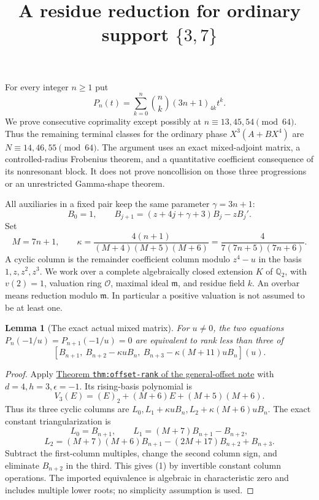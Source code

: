 \documentclass[11pt]{article}
\newtheorem{lemma}{Lemma}
\begin{document}
\setlength{\emergencystretch}{1em}
\title{A residue reduction for ordinary support $\{3,7\}$}
\author{}\date{}\maketitle
For every integer $n\ge1$ put
\[
 P_n(t)=\sum_{k=0}^n\binom nk(3n+1)_{4k}t^k.
\]
We prove consecutive coprimality except possibly at
$n\equiv13,45,54\pmod{64}$. Thus the remaining terminal classes
for the ordinary phase $X^3(A+BX^4)$ are
$N\equiv14,46,55\pmod{64}$.
The argument uses an exact mixed-adjoint matrix, a controlled-radius
Frobenius theorem, and a quantitative coefficient consequence of
its nonresonant block. It does not prove noncollision on those
three progressions or an unrestricted Gamma-shape theorem.

All auxiliaries in a fixed pair keep the same parameter
$\gamma=3n+1$:
\[
 B_0=1,\qquad B_{j+1}=(z+4j+\gamma+3)B_j-zB_j'.
\]
Set
\[
 M=7n+1,\qquad
 \kappa=\frac{4(n+1)}{(M+4)(M+5)(M+6)}
        =\frac4{7(7n+5)(7n+6)}.
\]
A cyclic column is the remainder coefficient column modulo
$z^4-u$ in the basis $1,z,z^2,z^3$.
We work over a complete algebraically closed extension $K$ of
$\mathbb Q_2$, with $v(2)=1$, valuation ring $\mathcal O$,
maximal ideal $\mathfrak m$, and residue field $k$.
An overbar means reduction modulo $\mathfrak m$.
In particular a positive valuation is not assumed to be at least one.

\begin{lemma}[The exact actual mixed matrix]\label{lem:mixed-matrix}
For $u\ne0$, the two equations
$P_n(-1/u)=P_{n+1}(-1/u)=0$ are equivalent to rank less than three of
\[
 [B_{n+1},\ B_{n+2}-\kappa uB_n,\
                   B_{n+3}-\kappa(M+11)uB_n](u).        \tag{1}
\]
\end{lemma}
\begin{proof}
Apply \href{DIAGONAL_PRIME_GAP_SFC.tex}{Theorem
\texttt{thm:offset-rank} of the general-offset note}
with $d=4,h=3,\epsilon=-1$.
Its rising-basis polynomial is
\[
 V_3(E)=(E)_2+(M+6)E+(M+5)(M+6).
\]
Thus its three cyclic columns are
$L_0,L_1+\kappa uB_n,L_2+\kappa(M+6)uB_n$.
The exact constant triangularization is
\[
 L_0=B_{n+1},\qquad
 L_1=(M+7)B_{n+1}-B_{n+2},
\]
\[
 L_2=(M+7)(M+6)B_{n+1}-(2M+17)B_{n+2}+B_{n+3}.
\]
Subtract the first-column multiples, change the second column sign,
and eliminate $B_{n+2}$ in the third.
This gives (1) by invertible constant column operations.
The imported equivalence is algebraic in characteristic zero
and includes multiple lower roots; no simplicity assumption is used.
\end{proof}
\end{document}
